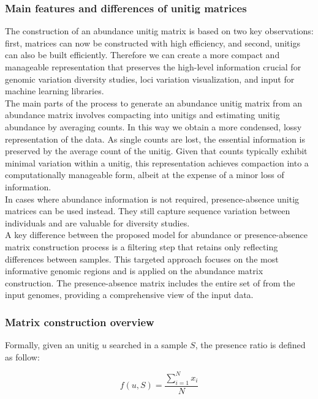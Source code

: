 \subsubsection{Main features and differences of unitig matrices}
The construction of an abundance unitig matrix is based on two key observations: first, \kmer matrices can now be constructed with high efficiency, and second, unitigs can also be built efficiently. Therefore we can create a more compact and manageable representation that preserves the high-level information crucial for genomic variation diversity studies, loci variation visualization, and input for machine learning libraries.\\
The main parts of the process to generate an abundance unitig matrix from an abundance \kmer matrix involves compacting \kmers into unitigs and estimating unitig abundance by averaging \kmer counts. In this way we obtain a more condensed, lossy representation of the data. As single \kmer counts are lost, the essential information is preserved by the average count of the unitig. Given that \kmer counts typically exhibit minimal variation within a unitig, this representation achieves compaction into a computationally manageable form, albeit at the expense of a minor loss of information.\\
In cases where abundance information is not required, presence-absence unitig matrices can be used instead. They still capture sequence variation between individuals and are valuable for diversity studies.\\
A key difference between the proposed model for abundance or presence-absence matrix construction process is a filtering step that retains only \kmers reflecting differences between samples. This targeted approach focuses on the most informative genomic regions and is applied on the abundance matrix construction. The presence-absence matrix includes the entire set of \kmers from the input genomes, providing a comprehensive view of the input data.\\

\subsubsection{Matrix construction overview}
Formally, given an unitig $u$ searched in a sample $S$, the \kmer presence ratio is defined as follow:

\begin{equation}
	f(u, S) = \frac{\sum_{i=1}^{N}{x_i}}{N}
\end{equation}

